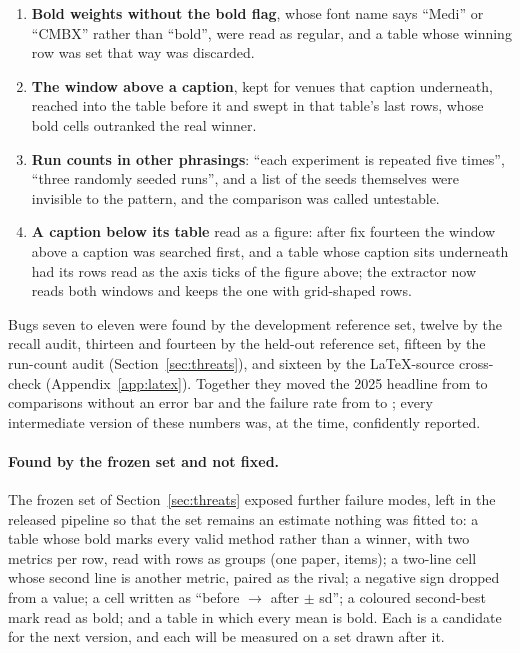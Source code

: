 \documentclass{article}
\begin{document}
\begin{enumerate}
  numbers; a whole table of them was called empty.
\item \textbf{Bold weights without the bold flag}, whose font name says
  ``Medi'' or ``CMBX'' rather than ``bold'', were read as regular, and a table
  whose winning row was set that way was discarded.
\item \textbf{The window above a caption}, kept for venues that caption
  underneath, reached into the table before it and swept in that table's last
  rows, whose bold cells outranked the real winner.
\item \textbf{Run counts in other phrasings}: ``each experiment is repeated
  five times'', ``three randomly seeded runs'', and a list of the seeds
  themselves were invisible to the pattern, and the comparison was called
  untestable.
\item \textbf{A caption below its table} read as a figure: after fix fourteen
  the window above a caption was searched first, and a table whose caption
  sits underneath had its rows read as the axis ticks of the figure above; the
  extractor now reads both windows and keeps the one with grid-shaped rows.
\end{enumerate}

Bugs seven to eleven were found by the development reference set, twelve by the
recall audit, thirteen and fourteen by the held-out reference set, fifteen by
the run-count audit (Section~\ref{sec:threats}), and sixteen by the
LaTeX-source cross-check (Appendix~\ref{app:latex}). Together
they moved the 2025 headline from \nPrefixNeither{} to \nPctNeitherSide{}
comparisons without an error bar and the failure rate from \nPrefixFail{} to
\nPctFail{}; every intermediate version of these numbers was, at the time,
confidently reported.

\paragraph{Found by the frozen set and not fixed.} The frozen set of
Section~\ref{sec:threats} exposed further failure modes, left in the released
pipeline so that the set remains an estimate nothing was fitted to: a table
whose bold marks every valid method rather than a winner, with two metrics
per row, read with rows as groups (one paper, \nGoldFrozenOnePaper{} items);
a two-line cell whose second line is another metric, paired as the rival; a
negative sign dropped from a value; a cell written as ``before $\to$ after
$\pm$ sd''; a coloured second-best mark read as bold; and a table in which
every mean is bold. Each is a candidate for the next version, and each will
be measured on a set drawn after it.
\end{document}
